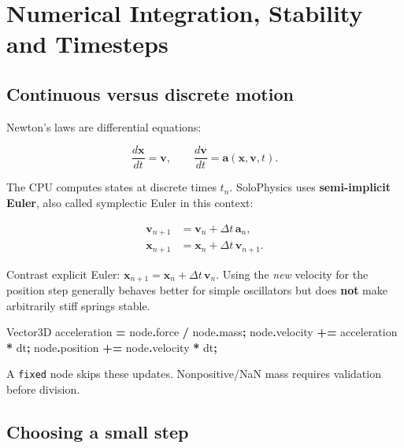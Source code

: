 \documentclass[
  10pt,
  a4paper,
]{article}
\newenvironment{Shaded}{\begin{snugshade}}{\end{snugshade}}
\newcommand{\NormalTok}[1]{#1}
\newcommand{\OperatorTok}[1]{\textcolor[rgb]{0.81,0.36,0.00}{\textbf{#1}}}
\begin{document}
\newpage

\section{Numerical Integration, Stability and
Timesteps}\label{numerical-integration-stability-and-timesteps}

\subsection{Continuous versus discrete
motion}\label{continuous-versus-discrete-motion}

Newton's laws are differential equations:

\[\frac{d\mathbf x}{dt}=\mathbf v,\qquad \frac{d\mathbf v}{dt}=\mathbf a(\mathbf x,\mathbf v,t).\]

The CPU computes states at discrete times \(t_n\). SoloPhysics uses
\textbf{semi-implicit Euler}, also called symplectic Euler in this
context:

\[\boxed{\begin{aligned}\mathbf v_{n+1}&=\mathbf v_n+\Delta t\,\mathbf a_n,\\\mathbf x_{n+1}&=\mathbf x_n+\Delta t\,\mathbf v_{n+1}.\end{aligned}}\]

Contrast explicit Euler:
\(\mathbf x_{n+1}=\mathbf x_n+\Delta t\,\mathbf v_n\). Using the
\emph{new} velocity for the position step generally behaves better for
simple oscillators but does \textbf{not} make arbitrarily stiff springs
stable.

\begin{Shaded}
\begin{Highlighting}[]
\NormalTok{Vector3D acceleration }\OperatorTok{=}\NormalTok{ node}\OperatorTok{.}\NormalTok{force }\OperatorTok{/}\NormalTok{ node}\OperatorTok{.}\NormalTok{mass}\OperatorTok{;}
\NormalTok{node}\OperatorTok{.}\NormalTok{velocity }\OperatorTok{+=}\NormalTok{ acceleration }\OperatorTok{*}\NormalTok{ dt}\OperatorTok{;}
\NormalTok{node}\OperatorTok{.}\NormalTok{position }\OperatorTok{+=}\NormalTok{ node}\OperatorTok{.}\NormalTok{velocity }\OperatorTok{*}\NormalTok{ dt}\OperatorTok{;}
\end{Highlighting}
\end{Shaded}

A \texttt{fixed} node skips these updates. Nonpositive/NaN mass requires
validation before division.

\subsection{Choosing a small step}\label{choosing-a-small-step}
\end{document}
